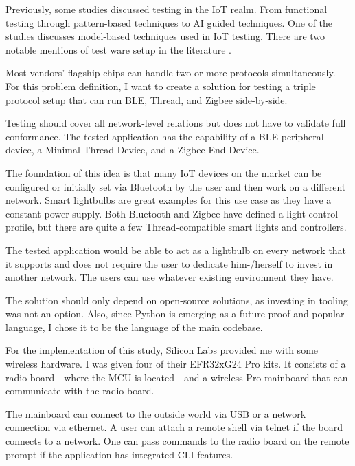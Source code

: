 Previously, some studies discussed testing in the IoT realm. From functional testing\cite{10.1145/3528227.3528568, 10.1145/3611643.3613888} through pattern-based techniques\cite{10.1145/3278186.3278196} to AI guided techniques\cite{10.1145/3387940.3392218, 10.1145/3539637.3558049}. One of the studies discusses model-based techniques used in IoT testing\cite{10.1145/3425329.3425330}. There are two notable mentions of test ware setup in the literature \cite{10.1145/3479239.3485708, 10.1145/3368235.3368832}.

Most vendors' flagship chips can handle two or more protocols simultaneously. For this problem definition, I want to create a solution for testing a triple protocol setup that can run BLE, Thread, and Zigbee side-by-side.

Testing should cover all network-level relations but does not have to validate full conformance. The tested application has the capability of a BLE peripheral device, a Minimal Thread Device, and a Zigbee End Device.

The foundation of this idea is that many IoT devices on the market can be configured or initially set via Bluetooth by the user and then work on a different network. Smart lightbulbs are great examples for this use case as they have a constant power supply. Both Bluetooth and Zigbee have defined a light control profile, but there are quite a few Thread-compatible smart lights and controllers.

The tested application would be able to act as a lightbulb on every network that it supports and does not require the user to dedicate him-/herself to invest in another network. The users can use whatever existing environment they have.

The solution should only depend on open-source solutions, as investing in tooling was not an option. Also, since Python is emerging as a future-proof and popular language, I chose it to be the language of the main codebase.

For the implementation of this study, Silicon Labs provided me with some wireless hardware\cite{silabs_wpk:2023}. I was given four of their EFR32xG24 Pro kits. It consists of a radio board - where the MCU is located - and a wireless Pro mainboard that can communicate with the radio board.

The mainboard can connect to the outside world via USB or a network connection via ethernet. A user can attach a remote shell via telnet if the board connects to a network. One can pass commands to the radio board on the remote prompt if the application has integrated CLI features.

